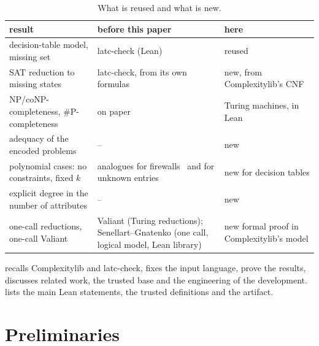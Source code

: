 \documentclass[pdflatex,sn-mathphys-num]{sn-jnl}
\theoremstyle{thmstyleone}
\theoremstyle{thmstylethree}
\begin{document}
\begin{table}[t]
\caption{What is reused and what is new.}
\label{tab:contrib}
\centering\small
\begin{tabular}{L{0.38\textwidth}L{0.26\textwidth}L{0.26\textwidth}}
\hline
result & before this paper & here \\
\hline
decision-table model, missing set & latc-check (Lean) & reused \\
SAT reduction to missing states & latc-check, from its own formulas & new, from Complexitylib's CNF \\
NP/coNP-completeness, \#P-completeness & on paper~\cite[Prop.~5]{PaperA} & Turing machines, in Lean \\
adequacy of the encoded problems & -- & new \\
polynomial cases: no constraints, fixed $k$ & analogues for firewalls~\cite{HamiltonRoughanNguyen2022} and for unknown entries~\cite{VuDemetrovics2026} & new for decision tables \\
explicit degree in the number of attributes & -- & new \\
one-call reductions, one-call Valiant & Valiant (Turing reductions); Senellart--Gnatenko (one call, logical model, Lean library) & new formal proof in Complexitylib's model \\
\hline
\end{tabular}
\end{table}

 recalls Complexitylib and latc-check,  fixes the input
language,  prove the results,
 discusses related work,  the trusted base and
 the engineering of the development.
 lists the main Lean statements,  the trusted
definitions and  the artifact.

\section{Preliminaries}
\label{sec:prelim}
\end{document}
